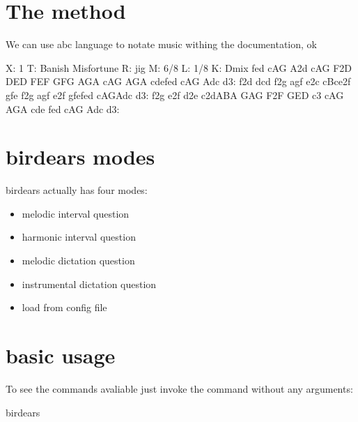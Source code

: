 \documentclass[letterpaper,10pt,english]{sphinxmanual}
\begin{document}
\section{The method}
\label{\detokenize{using:the-method}}
We can use abc language to notate music withing the documentation, ok

\begin{sphinxVerbatim}[commandchars=\\\{\}]
X: 1
T: Banish Misfortune
R: jig
M: 6/8
L: 1/8
K: Dmix
fed cAG\textbar{} A2d cAG\textbar{} F2D DED\textbar{} FEF GFG\textbar{}
AGA cAG\textbar{} AGA cde\textbar{}fed cAG\textbar{} Ad\PYGZca{}c d3:\textbar{}
f2d d\PYGZca{}cd\textbar{} f2g agf\textbar{} e2c cBc\textbar{}e2f gfe\textbar{}
f2g agf\textbar{} e2f gfe\textbar{}fed cAG\textbar{}Ad\PYGZca{}c d3:\textbar{}
f2g e2f\textbar{} d2e c2d\textbar{}ABA GAG\textbar{} F2F GED\textbar{}
c3 cAG\textbar{} AGA cde\textbar{} fed cAG\textbar{} Ad\PYGZca{}c d3:\textbar{}
\end{sphinxVerbatim}


\section{birdears modes}
\label{\detokenize{using:birdears-modes}}
birdears actually has four modes:
\begin{itemize}
\item {} 
melodic interval question

\item {} 
harmonic interval question

\item {} 
melodic dictation question

\item {} 
instrumental dictation question

\item {} 
load from config file

\end{itemize}


\section{basic usage}
\label{\detokenize{using:basic-usage}}
To see the commands avaliable just invoke the command without any arguments:

\begin{sphinxVerbatim}[commandchars=\\\{\}]
birdears
\end{sphinxVerbatim}
\end{document}
